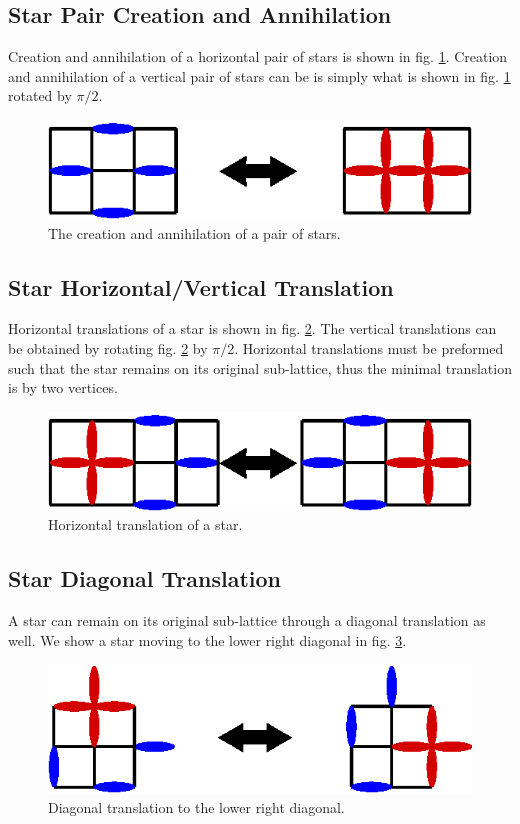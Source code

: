 \documentclass[aps,floatfix,11pt]{revtex4-1}
\begin{document}
\subsection{Star Pair Creation and Annihilation}

Creation and annihilation of a horizontal pair of stars is shown in fig.
\ref{fig:create_annihilate_pair}. Creation and annihilation of a vertical pair of stars can be
is simply what is shown in fig. \ref{fig:create_annihilate_pair} rotated by $\pi/2$.

\begin{figure}[h]
    \centering
    \includegraphics[width=8.5 cm]{create_annihilate_pair}
    \caption{The creation and annihilation of a pair of stars.
\label{fig:create_annihilate_pair}}
\end{figure}

\subsection{Star Horizontal/Vertical Translation}
Horizontal translations of a star is shown in fig. \ref{fig:move_right_left}. The vertical
translations can be obtained by rotating fig. \ref{fig:move_right_left} by $\pi/2$. Horizontal
translations must be preformed such that the star remains on its original sub-lattice, thus the
minimal translation is by two vertices.

\begin{figure}[h]
    \centering
    \includegraphics[width=8.5 cm]{move_right_left}
    \caption{Horizontal translation of a star.
\label{fig:move_right_left}}
\end{figure}


\subsection{Star Diagonal Translation}
A star can remain on its original sub-lattice through a diagonal translation as well. We show a star moving
to the lower right diagonal in fig. \ref{fig:diag}. 
\begin{figure}[h]
    \centering
    \includegraphics[width=8.5 cm]{diag}
    \caption{Diagonal translation to the lower right diagonal.
\label{fig:diag}}
\end{figure}
\end{document}
